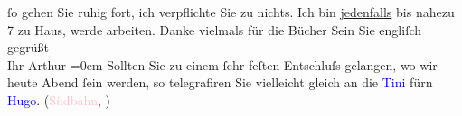                ſo gehen Sie ruhig fort, ich verpflichte Sie zu {\pb}nichts. Ich bin \uline{jedenfalls} bis nahezu 7 zu Haus,
               werde arbeiten.\pend
           \pstart
           Danke vielmals für die Bücher\pend
           \pstart
           Sein Sie engliſch gegrüßt{\\[\baselineskip]}Ihr \spacefill\mbox{Arthur}\pend
           \leftskip=0em{}\pstart
           Sollten Sie zu einem ſehr feſten Entschluſs gelangen, wo {\pb}wir heute Abend ſein werden, so telegrafiren Sie
               vielleicht gleich an die \textcolor{blue}{Tini}{}\ledrightnote{\textcolor{blue}{Christine Schönberger}} fürn \textcolor{blue}{Hugo}{}\ledrightnote{\textcolor{blue}{Hugo von Hofmannsthal}}. (\textcolor{pink}{Südbahn}{}\ledrightnote{\textcolor{pink}{Südbahnhof}},
                  \label{K_L00549_2v}\label{K_L00549_2h})\pend
           \endnumbering{}  
      